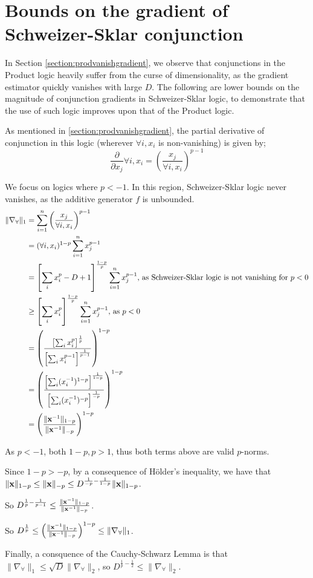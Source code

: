 \chapter{Bounds on the gradient of Schweizer-Sklar conjunction}
\label{section:ssbounds}

In Section \ref{section:prodvanishgradient}, we observe that conjunctions in the Product logic heavily suffer from the curse of dimensionality, as the gradient estimator quickly vanishes with large $D$. The following are lower bounds on the magnitude of conjunction gradients in Schweizer-Sklar logic, to demonstrate that the use of such logic improves upon that of the Product logic.

As mentioned in \ref{section:prodvanishgradient}, the partial derivative of conjunction in this logic (wherever $\forall i, x_i$ is non-vanishing) is given by;
$$\frac{\partial}{\partial x_j} \forall i, x_i = \left(\frac{x_j}{\forall i, x_i}\right)^{p-1}$$

We focus on logics where $p < -1$. In this region, Schweizer-Sklar logic never vanishes, as the additive generator $f$ is unbounded.
$$
\begin{aligned}
\lVert \nabla_\forall \rVert_1
&= \sum_{i=1}^n \left(\frac{x_j}{\forall i, x_i}\right)^{p-1} \\
&= (\forall i, x_i)^{1-p}\sum_{i=1}^nx_j^{p-1} \\
&= \left[\sum_ix_i^p-D+1\right]^\frac{1-p}{p}\sum_{i=1}^nx_j^{p-1} \text{, as Schweizer-Sklar logic is not vanishing for } p < 0 \\
&\geq \left[\sum_ix_i^p\right]^\frac{1-p}{p}\sum_{i=1}^nx_j^{p-1} \text{, as } p < 0 \\
&= \left(\frac{\left[\sum_ix_i^p\right]^\frac{1}{p}}{\left[\sum_ix_i^{p-1}\right]^\frac{1}{p-1}}\right)^{1-p} \\
&= \left(\frac{\left[\sum_i(x_i^{-1})^{1-p}\right]^\frac{1}{1-p}}{\left[\sum_i(x_i^{-1})^{-p}\right]^\frac{1}{-p}}\right)^{1-p} \\
&= \left(\frac{\lVert \mathbf{x}^{-1} \rVert_{1-p}}{\lVert \mathbf{x}^{-1} \rVert_{-p}}\right)^{1-p} \\
\end{aligned}
$$

As $p < -1$, both $1-p, p > 1$, thus both terms above are valid $p$-norms.

Since $1 - p > -p$, by a consequence of Hölder's inequality, we have that $\lVert \mathbf{x} \rVert_{1-p} \leq \lVert \mathbf{x} \rVert_{-p} \leq D^{\frac{1}{-p} - \frac{1}{1-p}} \lVert \mathbf{x} \rVert_{1-p}$.

So $D^{\frac{1}{p}-\frac{1}{p-1}} \leq \frac{\lVert \mathbf{x}^{-1} \rVert_{1-p}}{\lVert \mathbf{x}^{-1} \rVert_{-p}}$.

So $D^\frac{1}{p} \leq \left(\frac{\lVert \mathbf{x}^{-1} \rVert_{1-p}}{\lVert \mathbf{x}^{-1} \rVert_{-p}}\right)^{1-p} \leq \lVert \nabla_\forall \rVert_1$.

Finally, a consquence of the Cauchy-Schwarz Lemma is that $\lVert \nabla_\forall \rVert_1 \leq \sqrt{D}\lVert \nabla_\forall \rVert_2$, so $D^{\frac{1}{p}-\frac{1}{2}} \leq \lVert \nabla_\forall \rVert_2$.



